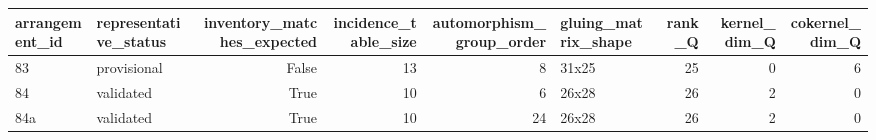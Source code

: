 \begin{tabular}{llrrrlrrr}
\toprule
arrangement_id & representative_status & inventory_matches_expected & incidence_table_size & automorphism_group_order & gluing_matrix_shape & rank_Q & kernel_dim_Q & cokernel_dim_Q \\
\midrule
83 & provisional & False & 13 & 8 & 31x25 & 25 & 0 & 6 \\
84 & validated & True & 10 & 6 & 26x28 & 26 & 2 & 0 \\
84a & validated & True & 10 & 24 & 26x28 & 26 & 2 & 0 \\
\bottomrule
\end{tabular}
